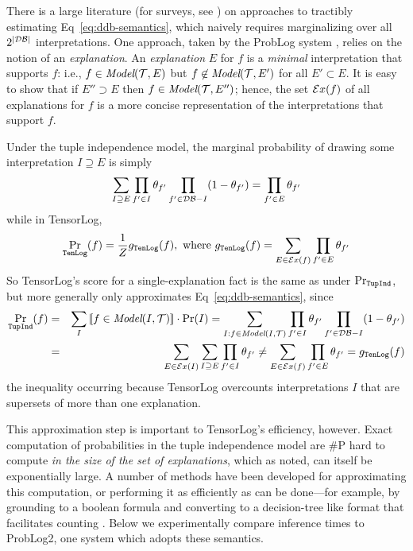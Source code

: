 \documentclass{article}
\newcommand{\cd}[1]{{\small \texttt{#1}}}
\newif\iflong
\newcommand{\longonly}[1]{\iflong{#1}\fi}
\newcommand{\trm}[1]{\textit{#1}}
\newcommand{\exs}{{\cal E}x}
\newcommand{\model}{\textit{Model}}
\newcommand{\T}{{\cal{T}}}
\newcommand{\DB}{{\cal{DB}}}
\newcommand{\indicate}[1]{|\![{#1}]\!|}
\begin{document}
There is a large literature (for surveys, see
\citet{suciu2011probabilistic,de2008probabilistic}) on approaches to
tractibly estimating Eq~\ref{eq:ddb-semantics}, which naively requires
marginalizing over all $2^{|\DB|}$ interpretations.  One approach, taken
by the ProbLog system \cite{fierens2016}, relies on the notion of an
\trm{explanation}.  An \trm{explanation} $E$ for $f$ is a
\emph{minimal} interpretation that supports $f$: i.e.,
$f\in{}\model(\T,E)$ but $f\not\in{}\model(\T,E')$ for all
$E'\subset{}E$.  It is easy to show that if $E'' \supset{} E$ then
$f\in{}\model(\T,E'')$; hence, the set $\exs(f)$ of all explanations
for $f$ is a more concise representation of the interpretations that
support $f$.  \longonly{Some sample explanations are shown in
  Table~\ref{tab:queries}.}

Under the tuple independence model\longonly{ of
  Eq~\ref{eq:tuple-indep}}, the marginal probability of drawing some
interpretation $I\supseteq{}E$ is simply
\[ \sum_{I \supseteq E} \prod_{f'\in{}I} \theta_{f'} \prod_{f'\in{}\DB-I} (1-\theta_{f'}) = \prod_{f'\in{}E} \theta_{f'}
\]
while in TensorLog, 
\[ \Pr_\cd{TenLog}(f) = \frac{1}{Z} g_\cd{TenLog}(f), \mbox{~where~} g_\cd{TenLog}(f) = \sum_{E\in{}\exs(f)} \prod_{f'\in{}E} \theta_{f'} 
\]
So TensorLog's score for a single-explanation fact is the same as under $\Pr_\cd{TupInd}$, but more generally only
approximates Eq~\ref{eq:ddb-semantics}, since 
\begin{eqnarray*}
 \Pr_\cd{TupInd}(f) & =  & \sum_{I} \indicate{f\in\model(I,\T)} \cdot \Pr(I) = \sum_{I:f\in\model(I,\T)} \prod_{f'\in{}I} \theta_{f'}\prod_{f'\in{}\DB-I} (1-\theta_{f'}) \\
       & = & \sum_{E\in{}\exs(I)} \sum_{I\supseteq E} \prod_{f'\in{}I} \theta_{f'} \not= \sum_{E\in\exs(f)} \prod_{f'\in{}E} \theta_{f'} = g_\cd{TenLog}(f)
\end{eqnarray*}
the inequality occurring because TensorLog overcounts interpretations
$I$ that are supersets of more than one explanation.  

This approximation step is important to TensorLog's efficiency,
however. Exact computation of probabilities in the tuple independence
model are \#P hard to compute \cite{fierens2016} \trm{in
  the size of the set of explanations}, which as noted, can itself be
exponentially large.  A number of methods have been developed for
approximating this computation, or performing it as efficiently as can
be done---for example, by grounding to a boolean formula and
converting to a decision-tree like format that facilitates counting
\cite{suciu2011probabilistic}.  Below we experimentally compare
inference times to ProbLog2, one system which adopts these semantics.
\end{document}
